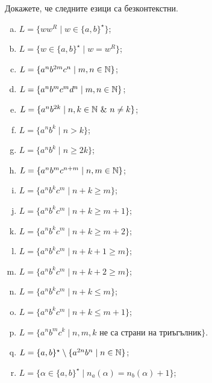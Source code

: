 \begin{problem}
  Докажете, че следните езици са безконтекстни.
  \begin{enumerate}[a)]
  \item
    $L = \{ww^R \mid w \in \{a,b\}^\star\}$;
  \item
    $L = \{w \in \{a,b\}^\star \mid w = w^R\}$;
  \item
    $L = \{a^nb^{2m}c^{n} \mid m,n \in \mathbb{N}\}$;
  \item
    $L = \{a^nb^{m}c^{m}d^n \mid m,n \in \mathbb{N}\}$;
  \item
    $L = \{a^nb^{2k} \mid n,k \in \Nat\ \&\ n \neq k\}$;
  \item
    $L = \{a^nb^k \mid n > k\}$;
  \item
    $L = \{a^nb^k \mid n \geq 2k\}$;
  \item
    $L = \{a^nb^mc^{n+m}\mid n,m \in \mathbb{N}\}$;
  \item
    $L = \{a^nb^kc^m \mid n + k \geq m\}$;
  \item
    $L = \{a^nb^kc^m \mid n + k \geq m+1\}$;
  \item
    $L = \{a^nb^kc^m \mid n + k \geq m+2\}$;
  \item
    $L = \{a^nb^kc^m \mid n + k + 1 \geq m\}$;
  \item
    $L = \{a^nb^kc^m \mid n + k + 2 \geq m\}$;
  \item
    $L = \{a^nb^kc^m \mid n + k \leq m\}$;
  \item
    $L = \{a^nb^kc^m \mid n + k \leq m+1\}$;
  \item
    $L = \{a^nb^mc^k \mid n, m, k \text{ не са страни на триъгълник}\}$.
  \item
    $L = \{a,b\}^\star \setminus \{a^{2n}b^n \mid n\in\mathbb{N}\}$;
  \item
    $L = \{\alpha \in \{a,b\}^\star\mid n_a(\alpha) = n_b(\alpha) + 1\}$;

\end{enumerate}
\end{problem}
